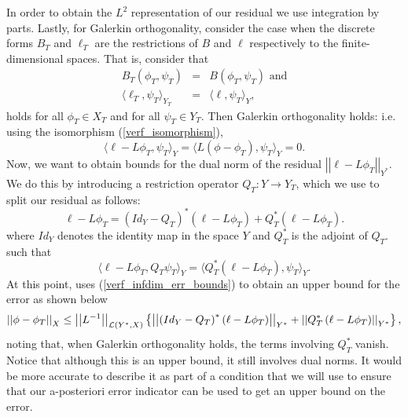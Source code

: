 \documentclass[12pt,a4paper]{article}
\theoremstyle{definition}
\begin{document}
In order to obtain the $L^2$ representation of our residual we use integration by parts.  Lastly, for Galerkin orthogonality, consider the case when the discrete forms $B_T$ and $\ell_T$ are the restrictions of $B$ and $\ell$ respectively to the finite-dimensional spaces.  That is, consider that
\begin{eqnarray}
B_T\left(\phi_T,\psi_T\right)&=&B\left(\phi_T,\psi_T\right)\text{ and}\\
\langle \ell_T, \psi_T\rangle_{Y_T} &=& \langle \ell, \psi_T\rangle_{Y},
\end{eqnarray}
holds for all $\phi_T\in X_T$ and for all $\psi_T \in Y_T$.  Then Galerkin orthogonality holds: i.e. using the isomorphism (\ref{verf_isomorphism}),
\begin{equation}
\langle \ell -L\phi_T,\psi_T\rangle_{Y}=\langle L\left(\phi-\phi_T\right),\psi_T\rangle_{Y}=0.
\end{equation}
Now, we want to obtain bounds for the dual norm of the residual $\left|\left|\ell-L\phi_T\right|\right|_{Y^*}$.  We do this by introducing a restriction operator $Q_T:Y\rightarrow Y_T$, which we use to split our residual as follows:
\begin{equation}\label{verf_residual_split}
\ell-L\phi_T=\left(Id_Y-Q_T\right)^*\left(\ell-L\phi_T\right)+Q_T^*\left(\ell-L\phi_T\right).
\end{equation}
where $Id_Y$ denotes the identity map in the space $Y$ and $Q_T^*$ is the adjoint of $Q_T$. such that 
\begin{equation}
\langle \ell -L\phi_T, Q_T\psi_T\rangle_Y = \langle Q_T^*\left(\ell -L\phi_T\right), \psi_T\rangle_Y. 
\end{equation}  
At this point, \cite{verfurth2013posteriori} uses (\ref{verf_infdim_err_bounds}) to obtain an upper bound for the error as shown below
\begin{equation}\small
\left|\left|\phi-\phi_T\right|\right|_X\leq \left|\left|L^{-1}\right|\right|_{\mathcal{L}\left(Y^*,X\right)}\left\lbrace\left|\left| \left(Id_Y-Q_T\right)^*\left(\ell-L\phi_T\right)\right|\right|_{Y^*} +\left|\left| Q_T^*\left(\ell-L\phi_T\right)\right|\right|_{Y^*}\right\rbrace,
\end{equation}
noting that, when Galerkin orthogonality holds, the terms involving $Q_T^*$ vanish.  Notice that although this is an upper bound, it still involves dual norms.  It would be more accurate to describe it as part of a condition that we will use to ensure that our a-posteriori error indicator can be used to get an upper bound on the error.
\end{document}
